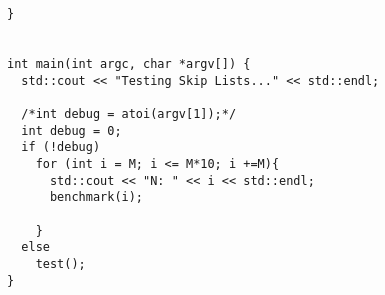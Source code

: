 \begin{lstlisting}[caption=Code from file main.cpp, style=myC]
}


int main(int argc, char *argv[]) {
  std::cout << "Testing Skip Lists..." << std::endl;

  /*int debug = atoi(argv[1]);*/
  int debug = 0;
  if (!debug)
    for (int i = M; i <= M*10; i +=M){
      std::cout << "N: " << i << std::endl;
      benchmark(i);

    }
  else
    test();
}

\end{lstlisting}